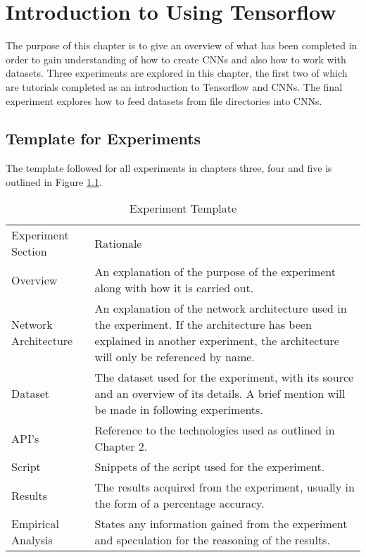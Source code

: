 \chapter{Introduction to Using Tensorflow}
The purpose of this chapter is to give an overview of what has been completed in order to gain understanding of how to create CNNs and also how to work with datasets. Three experiments are explored in this chapter, the first two of which are tutorials completed as an introduction to Tensorflow and CNNs. The final experiment explores how to feed datasets from file directories into CNNs.

\section{Template for Experiments}
The template followed for all experiments in chapters three, four and five is outlined in Figure \ref{fig:expTemplate}.

\begin{table}[]
\centering
\caption{Experiment Template}
\label{fig:expTemplate}
\begin{tabular}{|p{4cm}|p{11cm}|}
Experiment Section   & Rationale                \\
Overview             & An explanation of the purpose of the experiment along with how it is carried out. \\
Network Architecture & An explanation of the network architecture used in the experiment. If the architecture has been explained in another experiment, the architecture will only be referenced by name.                       \\
Dataset              & The dataset used for the experiment, with its source and an overview of its details. A brief mention will be made in following experiments.                       \\
API's                & Reference to the technologies used as outlined in Chapter 2.                      \\
Script               & Snippets of the script used for the experiment.                       \\
Results              & The results acquired from the experiment, usually in the form of a percentage accuracy.                       \\
Empirical Analysis   & States any information gained from the experiment and speculation for the reasoning of the results.                      
\end{tabular}
\end{table}

